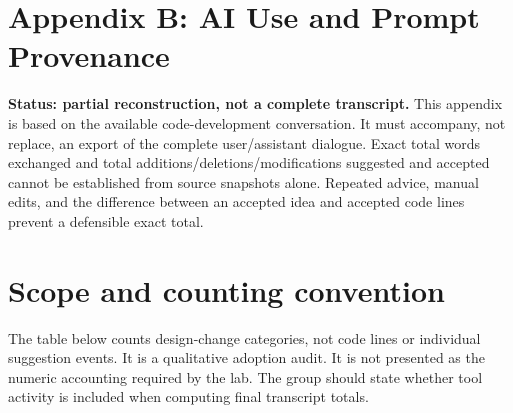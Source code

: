 \documentclass[11pt,letterpaper]{article}
\begin{document}
\clearpage
\section*{Appendix B: AI Use and Prompt Provenance}

\textbf{Status: partial reconstruction, not a complete transcript.} This appendix is based on the available code-development conversation. It must accompany, not replace, an export of the complete user/assistant dialogue. Exact total words exchanged and total additions/deletions/modifications suggested and accepted cannot be established from source snapshots alone. Repeated advice, manual edits, and the difference between an accepted idea and accepted code lines prevent a defensible exact total.

\section*{Scope and counting convention}

The table below counts design-change categories, not code lines or individual suggestion events. It is a qualitative adoption audit. It is not presented as the numeric accounting required by the lab. The group should state whether tool activity is included when computing final transcript totals.
\end{document}
